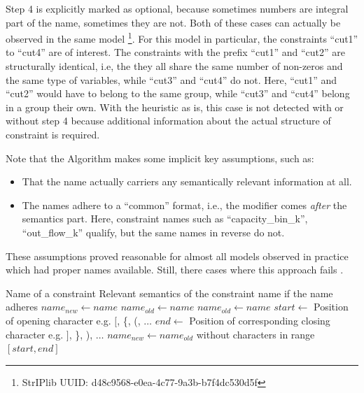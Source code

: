 			Step 4 is explicitly marked as optional, because sometimes numbers are integral part of the name, sometimes they are not.
			Both of these cases can actually be observed in the same model \footnote{StrIPlib UUID: d48c9568-e0ea-4c77-9a3b-b7f4dc530d5f}.
			For this model in particular, the constraints \enquote{cut1} to \enquote{cut4} are of interest.
			The constraints with the prefix \enquote{cut1} and \enquote{cut2} are structurally identical, i.e, the they all share the same number of non-zeros and the same type of variables, while \enquote{cut3} and \enquote{cut4} do not.
			Here, \enquote{cut1} and \enquote{cut2} would have to belong to the same group, while \enquote{cut3} and \enquote{cut4} belong in a group their own.
			With the heuristic as is, this case is not detected with or without step 4 because additional information about the actual structure of constraint is required.
			
			Note that the Algorithm makes some implicit key assumptions, such as:
			\begin{itemize}
				\item That the name actually carriers any semantically relevant information at all.
				\item The names adhere to a \enquote{common} format, i.e., the modifier comes \textit{after} the semantics part. Here, constraint names such as \enquote{capacity\_bin\_k}, \enquote{out\_flow\_k} qualify, but the same names in reverse do not.
			\end{itemize}
			
			These assumptions proved reasonable for almost all models observed in practice which had proper names available. Still, there cases where this approach fails .
		
			\begin{algorithm}[ht!]
				\centering
				\begin{algorithmic}
					\Require Name of a constraint
					\Ensure Relevant semantics of the constraint name if the name adheres 
					\Statex
						\State ${name}_{new} \gets name$
						\State ${name}_{old} \gets name$
						\Repeat
							\State ${name}_{old} \gets name$
							\State $start \gets$ Position of opening character e.g. $\lbrack$, \{, (, $\ldots$
							\State $end \gets$ Position of corresponding closing character e.g. $\rbrack$, \}, ), $\ldots$
							\State ${name}_{new} \gets {name}_{old}$ without characters in range $[start, end]$ 
					\EndFunction
				\end{algorithmic}
				\caption{}
				\label{algo:tree:scoring:nameheur}
			\end{algorithm}
			
